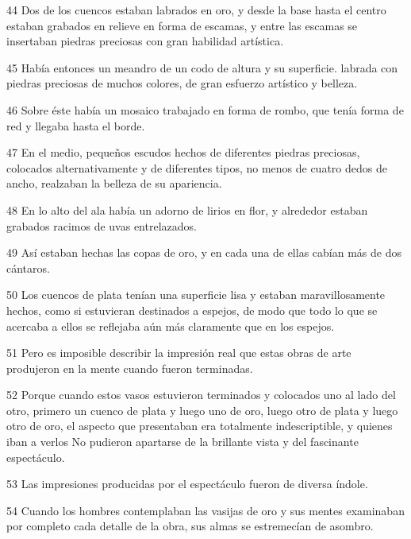 \par 44 Dos de los cuencos estaban labrados en oro, y desde la base hasta el centro estaban grabados en relieve en forma de escamas, y entre las escamas se insertaban piedras preciosas con gran habilidad artística.

\par 45 Había entonces un meandro de un codo de altura y su superficie. labrada con piedras preciosas de muchos colores, de gran esfuerzo artístico y belleza.

\par 46 Sobre éste había un mosaico trabajado en forma de rombo, que tenía forma de red y llegaba hasta el borde.

\par 47 En el medio, pequeños escudos hechos de diferentes piedras preciosas, colocados alternativamente y de diferentes tipos, no menos de cuatro dedos de ancho, realzaban la belleza de su apariencia.

\par 48 En lo alto del ala había un adorno de lirios en flor, y alrededor estaban grabados racimos de uvas entrelazados.

\par 49 Así estaban hechas las copas de oro, y en cada una de ellas cabían más de dos cántaros.

\par 50 Los cuencos de plata tenían una superficie lisa y estaban maravillosamente hechos, como si estuvieran destinados a espejos, de modo que todo lo que se acercaba a ellos se reflejaba aún más claramente que en los espejos.

\par 51 Pero es imposible describir la impresión real que estas obras de arte produjeron en la mente cuando fueron terminadas.

\par 52 Porque cuando estos vasos estuvieron terminados y colocados uno al lado del otro, primero un cuenco de plata y luego uno de oro, luego otro de plata y luego otro de oro, el aspecto que presentaban era totalmente indescriptible, y quienes iban a verlos No pudieron apartarse de la brillante vista y del fascinante espectáculo.

\par 53 Las impresiones producidas por el espectáculo fueron de diversa índole.

\par 54 Cuando los hombres contemplaban las vasijas de oro y sus mentes examinaban por completo cada detalle de la obra, sus almas se estremecían de asombro.

